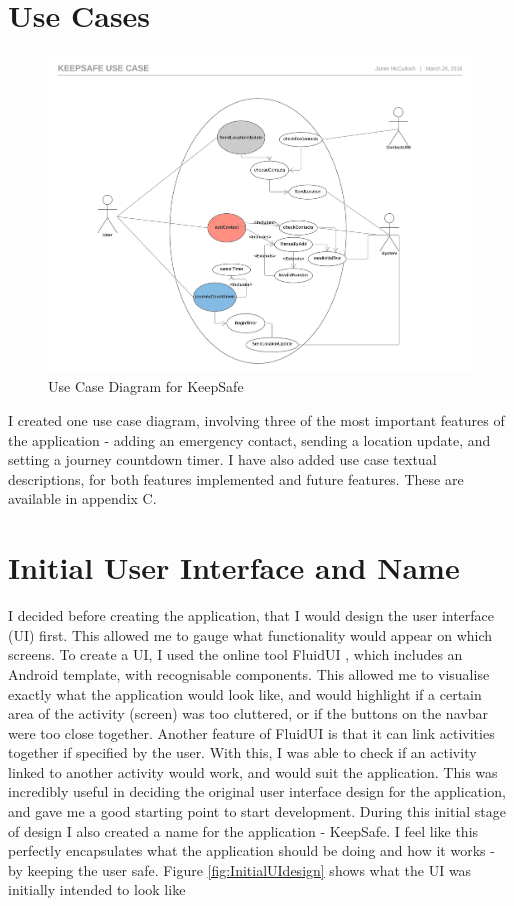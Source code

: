 \documentclass[a4paper]{report}
\begin{document}
\section{Use Cases}
\label{sec:UseCases}
\begin{figure}[h]
	\includegraphics [width = 190mm]{KeepSafe.png}
	\caption{Use Case Diagram for KeepSafe}
	\label{fig:UseCase}
\end{figure}
I created one use case diagram, involving three of the most important features of the application - adding an emergency contact, sending a location update, and setting a journey countdown timer. I have also added use case textual descriptions, for both features implemented and future features. These are available in appendix C. 

\section{Initial User Interface and Name}
\label{sec:InitUI}
I decided before creating the application, that I would design the user interface (UI) first. This allowed me to gauge what functionality would appear on which screens. To create a UI, I used the online tool FluidUI \cite{fluidui}, which includes an Android template, with recognisable components. This allowed me to visualise exactly what the application would look like, and would highlight if a certain area of the activity (screen) was too cluttered, or if the buttons on the navbar were too close together. Another feature of FluidUI is that it can link activities  together if specified by the user. With this, I was able to check if an activity linked to another activity would work, and would suit the application. This was incredibly useful in deciding the original user interface design for the application, and gave me a good starting point to start development.
During this initial stage of design I also created a name for the application - KeepSafe. I feel like this perfectly encapsulates what the application should be doing and how it works - by keeping the user safe. Figure \ref{fig:InitialUIdesign} shows what the UI was initially intended to look like \\ 
\end{document}
